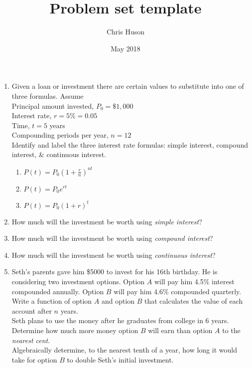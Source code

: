 \documentclass[12pt, oneside]{article}
\title{Problem set template}
\author{Chris Huson}
\date{May 2018}
\begin{document}


\begin{enumerate}

\item Given a loan or investment there are certain values to substitute into one of three formulas. Assume\\[5pt]
Principal amount invested, $P_0= \$1,000$\\[5pt]
Interest rate, $r=5\% = 0.05$\\[5pt]
Time, $t=5$ years \\[5pt]
Compounding periods per year, $n=12$\\[25pt]
Identify and label the three interest rate formulas: simple interest, compound interest, \& continuous interest.
\begin{enumerate}
    \item $\displaystyle P(t)=P_0 (1 + \frac{r}{n})^{nt}$
    \item $P(t)=P_0 e^{rt}$
    \item $P(t)=P_0 (1 + r)^{t}$
\end{enumerate}

\item How much will the investment be worth using \emph{simple interest}? \\[1.5in]

\item How much will the investment be worth using \emph{compound interest}? \\[1.5in]

\item How much will the investment be worth using \emph{continuous interest}? \\[.5in]

\newpage
\item Seth’s parents gave him \$5000 to invest for his 16th birthday. He is considering two investment options. Option $A$ will pay him 4.5\% interest compounded annually. Option $B$ will pay him 4.6\% compounded quarterly.\\[10pt]
Write a function of option $A$ and option $B$ that calculates the value of each account after $n$ years.\\[2in]
Seth plans to use the money after he graduates from college in 6 years. Determine how much more money option $B$ will earn than option $A$ to the \emph{nearest cent}.\\[2in]
Algebraically determine, to the nearest tenth of a year, how long it would take for option $B$ to double Seth’s initial investment. %



\end{enumerate}
\end{document}
